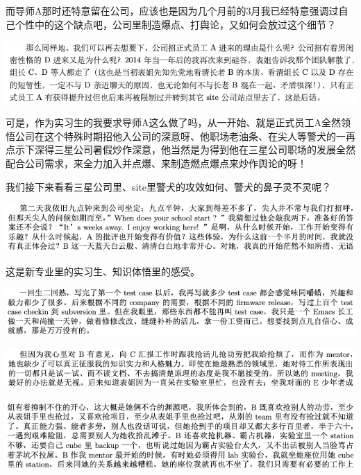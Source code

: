 \documentclass[9pt, b5paper]{article}
\begin{document}
而导师A那时还特意留在公司，应该也是因为几个月前的3月我已经特意强调过自己个性中的这个缺点吧，公司里制造爆点、打舆论，又如何会放过这个细节？

\begin{center}
\includegraphics[width=.9\linewidth]{./pic/backups_plans_20210512_105449.png}
\end{center}

可是，作为实习生的我要求导师A这么做了吗，从一开始、就是正式员工A全然领悟公司在这个特殊时期招他入公司的深意呀、他职场老油条、在尖人等警犬的一再点示下深得三星公司暑假炒作深意，他当然是为得到他在三星公司职场的发展全然配合公司需求，来全力加入并点爆、来制造燃点爆点来炒作舆论的呀！ 

我们接下来看看三星公司里、site里警犬的攻效如何、警犬的鼻子灵不灵呢？

\begin{center}
\includegraphics[width=.9\linewidth]{./pic/backups_plans_20210512_105614.png}
\end{center}

这是新专业里的实习生、知识体悟里的感受。

\begin{center}
\includegraphics[width=.9\linewidth]{./pic/backups_plans_20210512_111724.png}
\end{center}

\begin{center}
\includegraphics[width=.9\linewidth]{./pic/backups_plans_20210512_111818.png}
\end{center}

\begin{center}
\includegraphics[width=.9\linewidth]{./pic/backups_plans_20210512_113149.png}
\end{center}
\end{document}
